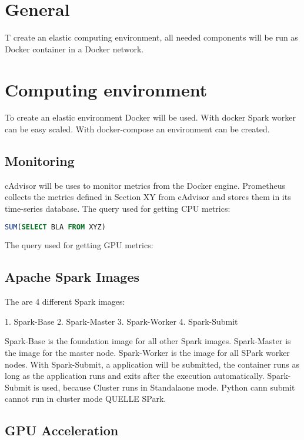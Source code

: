 \section{General}
T create an elastic computing environment, all needed components will be run as Docker container in a Docker network.


\section{Computing environment}
To create an elastic environment Docker will be used. With docker Spark worker can be easy scaled. With docker-compose an environment can be created.
\subsection{Monitoring}
cAdvisor will be uses to monitor metrics from the Docker engine. Prometheus collects the metrics defined in Section XY from cAdvisor and stores them in its time-series database.
The query used for getting CPU metrics:

\begin{lstlisting}[language=SQL, caption=Python example]
SUM(SELECT BLA FROM XYZ)
\end{lstlisting}

The query used for getting GPU metrics:


\subsection{Apache Spark Images}
The are 4 different Spark images:

1. Spark-Base
2. Spark-Master
3. Spark-Worker
4. Spark-Submit

Spark-Base is the foundation image for all other Spark images. Spark-Master is the image for the master node. Spark-Worker is the image for all SPark worker nodes. With Spark-Submit, a application will be submitted, the container runs as long as the application runs and exits after the execution automatically. Spark-Submit is used, because Cluster runs in Standalaone mode. Python cann submit cannot run in cluster mode QUELLE SPark.

\subsection{GPU Acceleration}

